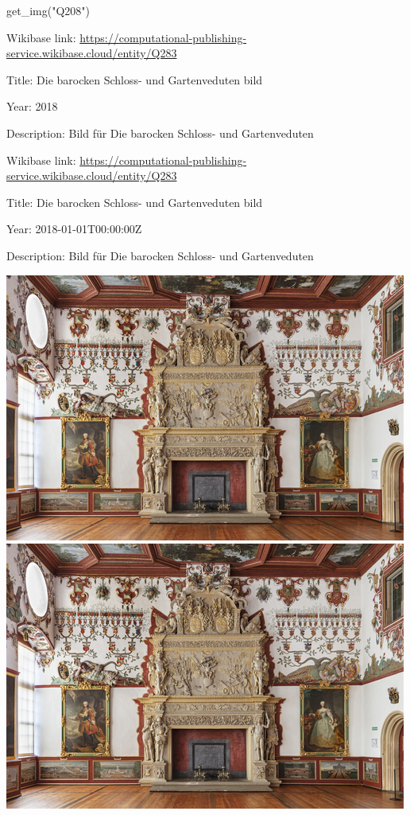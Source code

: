 \documentclass[
  a4paper,
]{book}
\newenvironment{Shaded}{\begin{snugshade}}{\end{snugshade}}
\newcommand{\NormalTok}[1]{\textcolor[rgb]{0.00,0.23,0.31}{#1}}
\newcommand{\StringTok}[1]{\textcolor[rgb]{0.13,0.47,0.30}{#1}}
\begin{document}
\begin{Shaded}
\begin{Highlighting}[]
\NormalTok{get\_img(}\StringTok{"Q208"}\NormalTok{)}
\end{Highlighting}
\end{Shaded}

Wikibase link:
\url{https://computational-publishing-service.wikibase.cloud/entity/Q283}

Title: Die barocken Schloss- und Gartenveduten bild

Year: 2018

Description: Bild für Die barocken Schloss- und Gartenveduten

Wikibase link:
\url{https://computational-publishing-service.wikibase.cloud/entity/Q283}

Title: Die barocken Schloss- und Gartenveduten bild

Year: 2018-01-01T00:00:00Z

Description: Bild für Die barocken Schloss- und Gartenveduten

\includegraphics{section_files/figure-pdf/cell-4-output-2.png}
\includegraphics{section_files/figure-pdf/cell-4-output-3.png}
\end{document}
